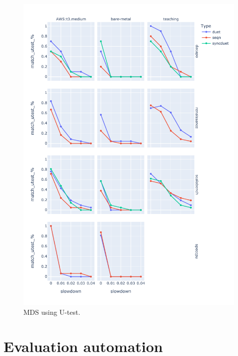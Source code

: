 \begin{figure}
	\centering
	\includegraphics[width=1\linewidth]{./figures/mds_utest.pdf}
	\caption{
    MDS using U-test.
	}
	\label{fig:mds_utest}
\end{figure}

\section{Evaluation automation}
\label{sec:automation}

